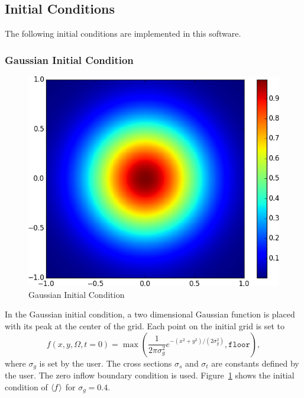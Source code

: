 \documentclass{article}
\begin{document}
\subsection{Initial Conditions}
\label{subsec:initcond}
\FloatBarrier
The following initial conditions are implemented in this software.

\subsubsection{Gaussian Initial Condition}
\begin{figure}
    \centering
    \includegraphics[height=0.3\textheight]{initcond_gaussian.png}
    \caption{Gaussian Initial Condition}
    \label{fig:gaussian_ic}
\end{figure}
In the Gaussian initial condition, a two dimensional Gaussian function
is placed with its peak at the center of the grid. Each point on the
initial grid is set to
\begin{equation}
    f(x,y,\Omega,t=0) = \max \left( \frac{1}{2 \pi \sigma_g^2} e^{-(x^2 + y^2) / (2 \sigma_g^2)}, \texttt{floor} \right), 
\end{equation}
where $\sigma_g$ is set by the user.
The cross sections $\sigma_s$ and $\sigma_t$ are constants defined by the user.
The zero inflow boundary condition is used.
Figure~\ref{fig:gaussian_ic} shows the initial condition of $\langle f \rangle$ for $\sigma_g = 0.4$. 
\end{document}
